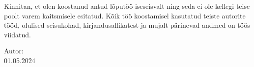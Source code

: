 Kinnitan, et olen koostanud antud lõputöö iseseisvalt ning seda ei ole kellegi teise poolt
varem kaitsmisele esitatud. Kõik töö koostamisel kasutatud teiste autorite tööd, olulised
seisukohad, kirjandusallikatest ja mujalt pärinevad andmed on töös viidatud.

\begin{flushleft}

Autor: \authorNames{}\\
\vspace*{0.5cm}
01.05.2024
 
\end{flushleft}
